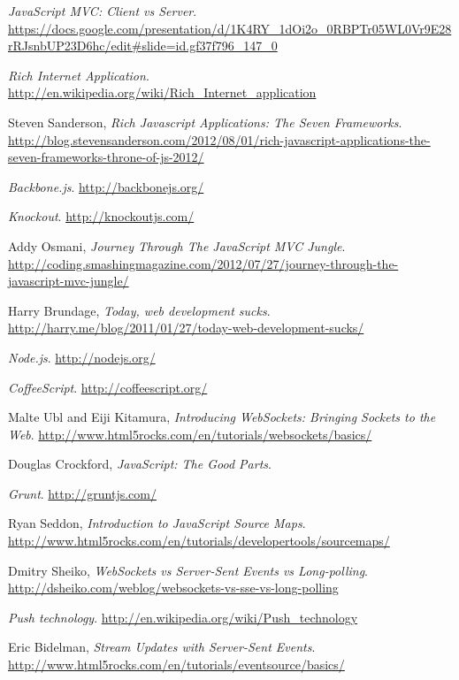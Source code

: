 \documentclass[doc,helv,longtable]{article}
\begin{document}
\begin{thebibliography}{150}

  \emph{JavaScript MVC: Client vs Server}.
  \url{https://docs.google.com/presentation/d/1K4RY_1dOi2o_0RBPTr05WL0Vr9E28rRJsnbUP23D6hc/edit#slide=id.gf37f796\_147\_0}

  \emph{Rich Internet Application}.
  \url{http://en.wikipedia.org/wiki/Rich_Internet_application}

  Steven Sanderson,
  \emph{Rich Javascript Applications: The Seven Frameworks}.
  \url{http://blog.stevensanderson.com/2012/08/01/rich-javascript-applications-the-seven-frameworks-throne-of-js-2012/}

  \emph{Backbone.js}.
  \url{http://backbonejs.org/}

  \emph{Knockout}.
  \url{http://knockoutjs.com/}

  Addy Osmani,
  \emph{Journey Through The JavaScript MVC Jungle}.
  \url{http://coding.smashingmagazine.com/2012/07/27/journey-through-the-javascript-mvc-jungle/}

  Harry Brundage,
  \emph{Today, web development sucks}.
  \url{http://harry.me/blog/2011/01/27/today-web-development-sucks/}

  \emph{Node.js}.
  \url{http://nodejs.org/}

  \emph{CoffeeScript}.
  \url{http://coffeescript.org/}

  Malte Ubl and Eiji Kitamura,
  \emph{Introducing WebSockets: Bringing Sockets to the Web}.
  \url{http://www.html5rocks.com/en/tutorials/websockets/basics/}

  Douglas Crockford,
  \emph{JavaScript: The Good Parts}.

  \emph{Grunt}.
  \url{http://gruntjs.com/}

  Ryan Seddon,
  \emph{Introduction to JavaScript Source Maps}.
  \url{http://www.html5rocks.com/en/tutorials/developertools/sourcemaps/}

  Dmitry Sheiko,
  \emph{WebSockets vs Server-Sent Events vs Long-polling}.
  \url{http://dsheiko.com/weblog/websockets-vs-sse-vs-long-polling}

  \emph{Push technology}.
  \url{http://en.wikipedia.org/wiki/Push_technology}

  Eric Bidelman,
  \emph{Stream Updates with Server-Sent Events}.
  \url{http://www.html5rocks.com/en/tutorials/eventsource/basics/}


\end{thebibliography}
\end{document}

